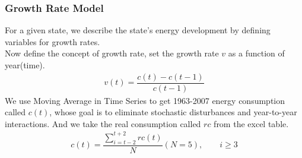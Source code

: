 \subsubsection{Growth Rate Model}
For a given state, we describe the state's energy development by defining variables for growth rates.\\
Now define the concept of growth rate, set the growth rate $ v $ as a function of year(time).\\
\begin{align}
v(t)=\dfrac{c(t)-c(t-1)}{c(t-1)}
\end{align}
We use Moving Average in Time Series to get 1963-2007 energy consumption called $ c(t) $\cite{mova}, whose goal is to eliminate stochastic disturbances and year-to-year interactions. And we take the real consumption called $ \mathit{rc} $ from the excel table.\\
\begin{align}
c(t)=\dfrac{\sum_{i=t-2}^{t+2}\mathit{rc(t)}}{N}(N=5),\qquad i\geq 3
\end{align}


